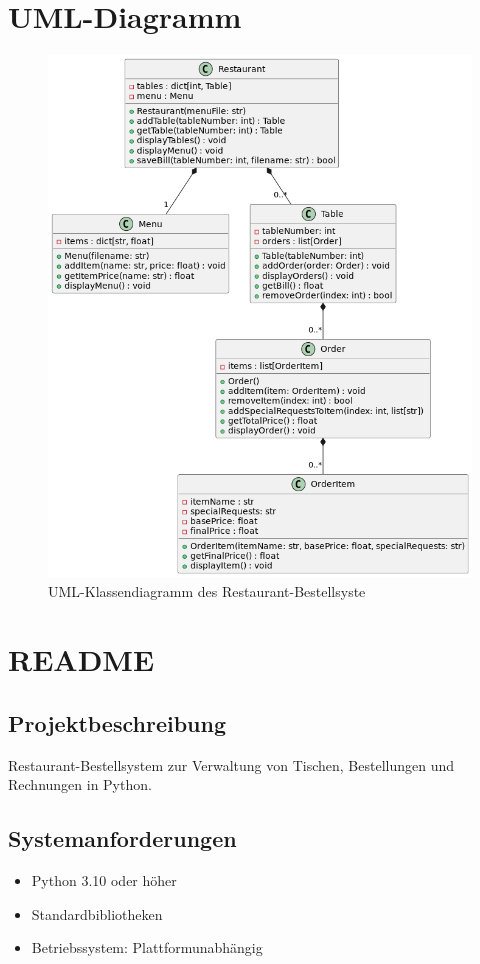 \documentclass[a4paper,11pt]{article}
\begin{document}
\section{UML-Diagramm}
\begin{figure}[h]
    \centering
    \includegraphics[width=\textwidth]{uml.png}
    \caption{UML-Klassendiagramm des Restaurant-Bestellsyste}
    \label{fig:uml}
\end{figure}

\section{README}
\subsection{Projektbeschreibung}
Restaurant-Bestellsystem zur Verwaltung von Tischen, Bestellungen und Rechnungen in Python.

\subsection{Systemanforderungen}
\begin{itemize}
    \item Python 3.10 oder höher
    \item Standardbibliotheken
    \item Betriebssystem: Plattformunabhängig
\end{itemize}
\end{document}
